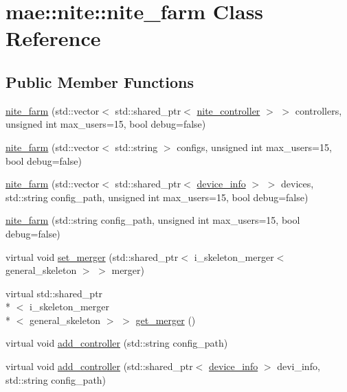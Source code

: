 \hypertarget{classmae_1_1nite_1_1nite__farm}{\section{mae\-:\-:nite\-:\-:nite\-\_\-farm Class Reference}
\label{classmae_1_1nite_1_1nite__farm}
}
\subsection*{Public Member Functions}
\begin{DoxyCompactItemize}
\item 
\hyperlink{classmae_1_1nite_1_1nite__farm_a03afc49c4667f301e7795ff70cc320c0}{nite\-\_\-farm} (std\-::vector$<$ std\-::shared\-\_\-ptr$<$ \hyperlink{classmae_1_1nite_1_1nite__controller}{nite\-\_\-controller} $>$ $>$ controllers, unsigned int max\-\_\-users=15, bool debug=false)
\item 
\hyperlink{classmae_1_1nite_1_1nite__farm_a64166763c2b7856455bea06cbff49812}{nite\-\_\-farm} (std\-::vector$<$ std\-::string $>$ configs, unsigned int max\-\_\-users=15, bool debug=false)
\item 
\hyperlink{classmae_1_1nite_1_1nite__farm_ad6377b8062fd6e002b70f0b83503bd20}{nite\-\_\-farm} (std\-::vector$<$ std\-::shared\-\_\-ptr$<$ \hyperlink{classmae_1_1nite_1_1device__info}{device\-\_\-info} $>$ $>$ devices, std\-::string config\-\_\-path, unsigned int max\-\_\-users=15, bool debug=false)
\item 
\hyperlink{classmae_1_1nite_1_1nite__farm_a2fb965a403bed9457a01ed3bb2e456fc}{nite\-\_\-farm} (std\-::string config\-\_\-path, unsigned int max\-\_\-users=15, bool debug=false)
\item 
virtual void \hyperlink{classmae_1_1nite_1_1nite__farm_a10675346cb9928b23d7be0c4429cdb2b}{set\-\_\-merger} (std\-::shared\-\_\-ptr$<$ i\-\_\-skeleton\-\_\-merger$<$ general\-\_\-skeleton $>$ $>$ merger)
\item 
virtual std\-::shared\-\_\-ptr\\*
$<$ i\-\_\-skeleton\-\_\-merger\\*
$<$ general\-\_\-skeleton $>$ $>$ \hyperlink{classmae_1_1nite_1_1nite__farm_af1e9e1ab6c76b0dc2cc8dd6a6ff5cf4b}{get\-\_\-merger} ()
\item 
virtual void \hyperlink{classmae_1_1nite_1_1nite__farm_aab2175dc92de9ed6dc7a7fffe6a6ecd9}{add\-\_\-controller} (std\-::string config\-\_\-path)
\item 
virtual void \hyperlink{classmae_1_1nite_1_1nite__farm_a9f5fe949307e4e34f9eb9def1012e952}{add\-\_\-controller} (std\-::shared\-\_\-ptr$<$ \hyperlink{classmae_1_1nite_1_1device__info}{device\-\_\-info} $>$ devi\-\_\-info, std\-::string config\-\_\-path)

\end{DoxyCompactItemize}
